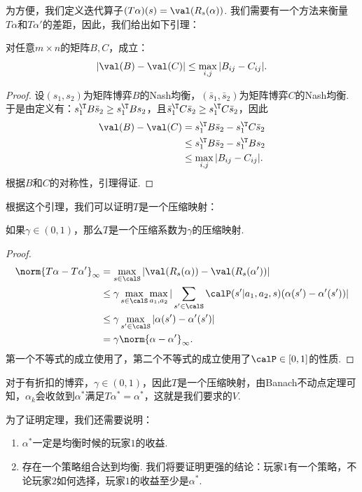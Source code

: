 为方便，我们定义迭代算子$(T\alpha)(s) = \val(R_s(\alpha))$. 我们需要有一个方法来衡量$T\alpha$和$T\alpha'$的差距，因此，我们给出如下引理：

\begin{lemma}\label{lemma:matrix-game}
对任意$m\times n$的矩阵$B,C$，成立：
\[|\val(B)-\val(C)| \leq \max_{i,j}|B_{ij} - C_{ij}|.\]
\end{lemma}

\begin{proof}
设$(s_1,s_2)$为矩阵博弈$B$的Nash均衡，$(\bar{s}_1,\bar{s}_2)$为矩阵博弈$C$的Nash均衡. 于是由定义有：$s_1^\T B\bar{s}_2  \ge s_1^\T  B s_2$，且$\bar{s}_1 ^\T  C\bar{s}_2 \ge s_1^\T  C \bar{s}_2 $，因此
\begin{align*}
    \val(B)-\val(C) &= s_1^\T B\bar{s}_2 - s_1^\T  C\bar{s}_2 \\
    &\leq s_1^\T  B\bar{s}_2  - s_1^\T  B s_2 \\
    &\leq \max_{i,j}|B_{ij} - C_{ij}|.
\end{align*}
根据$B$和$C$的对称性，引理得证.
\end{proof}

根据这个引理，我们可以证明$T$是一个压缩映射：

\begin{lemma}
    如果$\gamma\in(0,1)$，那么$T$是一个压缩系数为$\gamma$的压缩映射.
\end{lemma}
\begin{proof}
\begin{align*}
    \norm{T\alpha-T\alpha'}_\infty &= \max_{s\in \calS}|\val (R_s(\alpha)) - \val(R_s(\alpha'))| \\
    &\leq \gamma \max_{s\in \calS} \max_{a_1,a_2}|\sum_{s'\in \calS}\calP(s'|a_1,a_2,s)(\alpha(s') - \alpha'(s'))| \\
    &\leq \gamma \max_{s'\in \calS} |\alpha(s') - \alpha'(s')| \\
    &= \gamma \norm{\alpha-\alpha'}_\infty.
\end{align*}
第一个不等式的成立使用了，第二个不等式的成立使用了$\calP\in[0,1]$的性质. 
\end{proof}

对于有折扣的博弈，$\gamma\in (0,1)$，因此$T$是一个压缩映射，由Banach不动点定理可知，$\alpha_k$会收敛到$\alpha^*$满足$T\alpha^*=\alpha^*$，这就是我们要求的$V$.

为了证明定理，我们还需要说明：
\begin{enumerate}
    \item $\alpha^*$一定是均衡时候的玩家$1$的收益.
    \item 存在一个策略组合达到均衡. 我们将要证明更强的结论：玩家$1$有一个策略，不论玩家$2$如何选择，玩家$1$的收益至少是$\alpha^*$.
\end{enumerate}

